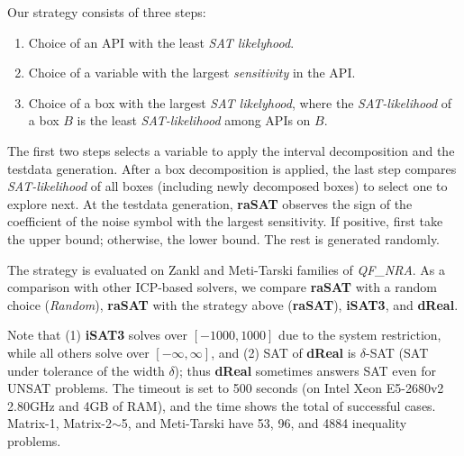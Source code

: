 \documentclass[runningheads,a4paper,oribibl]{llncs}
\begin{document}
Our strategy consists of three steps:
\begin{enumerate}
\item Choice of an API with the least {\em SAT likelyhood}.
\item Choice of a variable with the largest {\em sensitivity} in the API.
\item Choice of a box with the largest {\em SAT likelyhood}, where
the {\em SAT-likelihood} of a box $B$ is the least {\em SAT-likelihood} among APIs on $B$.
\end{enumerate}
The first two steps selects a variable to apply the interval decomposition and
the testdata generation. After a box decomposition is applied, the last step
compares {\em SAT-likelihood} of all boxes (including newly decomposed boxes)
to select one to explore next. 
%
At the testdata generation, 
{\bf raSAT} observes the sign of the coefficient of the noise symbol with the largest
sensitivity. 
If positive, first take the upper bound; %
otherwise, the lower bound. The rest is generated randomly. 

The strategy is evaluated on Zankl and Meti-Tarski families of \emph{QF\_NRA}.
As a comparison with other ICP-based solvers, we compare
{\bf raSAT} with a random choice ({\em Random}), {\bf raSAT} with the strategy above
({\bf raSAT}), {\bf iSAT3}, and {\bf dReal}.

Note that (1) {\bf iSAT3} solves over $[-1000,1000]$ due to the system restriction,
while all others solve over $[-\infty, \infty]$, and (2) SAT of {\bf dReal} is 
$\delta$-SAT (SAT under tolerance of the width $\delta$); thus {\bf dReal} sometimes
answers SAT even for UNSAT problems. 
The timeout is set to 500 seconds (on Intel Xeon E5-2680v2 2.80GHz and 4GB of RAM), 
and the time shows the total of successful cases. 
Matrix-1, Matrix-2$\sim$5, and Meti-Tarski have 53, 96, and 4884 inequality problems. 
\end{document}

